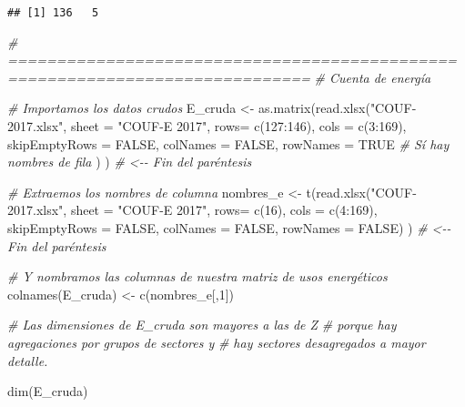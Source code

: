 \documentclass[
]{article}
\newenvironment{Shaded}{\begin{snugshade}}{\end{snugshade}}
\newcommand{\AttributeTok}[1]{\textcolor[rgb]{0.77,0.63,0.00}{#1}}
\newcommand{\CommentTok}[1]{\textcolor[rgb]{0.56,0.35,0.01}{\textit{#1}}}
\newcommand{\ConstantTok}[1]{\textcolor[rgb]{0.00,0.00,0.00}{#1}}
\newcommand{\DecValTok}[1]{\textcolor[rgb]{0.00,0.00,0.81}{#1}}
\newcommand{\FunctionTok}[1]{\textcolor[rgb]{0.00,0.00,0.00}{#1}}
\newcommand{\NormalTok}[1]{#1}
\newcommand{\OtherTok}[1]{\textcolor[rgb]{0.56,0.35,0.01}{#1}}
\newcommand{\SpecialCharTok}[1]{\textcolor[rgb]{0.00,0.00,0.00}{#1}}
\newcommand{\StringTok}[1]{\textcolor[rgb]{0.31,0.60,0.02}{#1}}
\begin{document}
\begin{verbatim}
## [1] 136   5
\end{verbatim}

\begin{Shaded}
\begin{Highlighting}[]
\CommentTok{\# =============================================================================}
\CommentTok{\# Cuenta de energía}

\CommentTok{\# Importamos los datos crudos}
\NormalTok{E\_cruda }\OtherTok{\textless{}{-}} \FunctionTok{as.matrix}\NormalTok{(}\FunctionTok{read.xlsx}\NormalTok{(}\StringTok{"COUF{-}2017.xlsx"}\NormalTok{, }
                               \AttributeTok{sheet =} \StringTok{"COUF{-}E 2017"}\NormalTok{, }
                               \AttributeTok{rows=} \FunctionTok{c}\NormalTok{(}\DecValTok{127}\SpecialCharTok{:}\DecValTok{146}\NormalTok{), }
                               \AttributeTok{cols =} \FunctionTok{c}\NormalTok{(}\DecValTok{3}\SpecialCharTok{:}\DecValTok{169}\NormalTok{), }
                               \AttributeTok{skipEmptyRows =} \ConstantTok{FALSE}\NormalTok{, }
                               \AttributeTok{colNames =} \ConstantTok{FALSE}\NormalTok{, }
                               \AttributeTok{rowNames =} \ConstantTok{TRUE} \CommentTok{\# Sí hay nombres de fila}
\NormalTok{                               )}
\NormalTok{)  }\CommentTok{\# \textless{}{-}{-} Fin del paréntesis}

\CommentTok{\# Extraemos los nombres de columna}
\NormalTok{nombres\_e }\OtherTok{\textless{}{-}} \FunctionTok{t}\NormalTok{(}\FunctionTok{read.xlsx}\NormalTok{(}\StringTok{"COUF{-}2017.xlsx"}\NormalTok{, }
                               \AttributeTok{sheet =} \StringTok{"COUF{-}E 2017"}\NormalTok{, }
                               \AttributeTok{rows=} \FunctionTok{c}\NormalTok{(}\DecValTok{16}\NormalTok{), }
                               \AttributeTok{cols =} \FunctionTok{c}\NormalTok{(}\DecValTok{4}\SpecialCharTok{:}\DecValTok{169}\NormalTok{), }
                               \AttributeTok{skipEmptyRows =} \ConstantTok{FALSE}\NormalTok{, }
                               \AttributeTok{colNames =} \ConstantTok{FALSE}\NormalTok{, }
                               \AttributeTok{rowNames =} \ConstantTok{FALSE}\NormalTok{)}
\NormalTok{                     )  }\CommentTok{\# \textless{}{-}{-} Fin del paréntesis}

\CommentTok{\# Y nombramos las columnas de nuestra matriz de usos energéticos}
\FunctionTok{colnames}\NormalTok{(E\_cruda) }\OtherTok{\textless{}{-}} \FunctionTok{c}\NormalTok{(nombres\_e[,}\DecValTok{1}\NormalTok{])}

\CommentTok{\# Las dimensiones de E\_cruda son mayores a las de Z}
\CommentTok{\# porque hay agregaciones por grupos de sectores y}
\CommentTok{\# hay sectores desagregados a mayor detalle.}

\FunctionTok{dim}\NormalTok{(E\_cruda)}
\end{Highlighting}
\end{Shaded}
\end{document}
